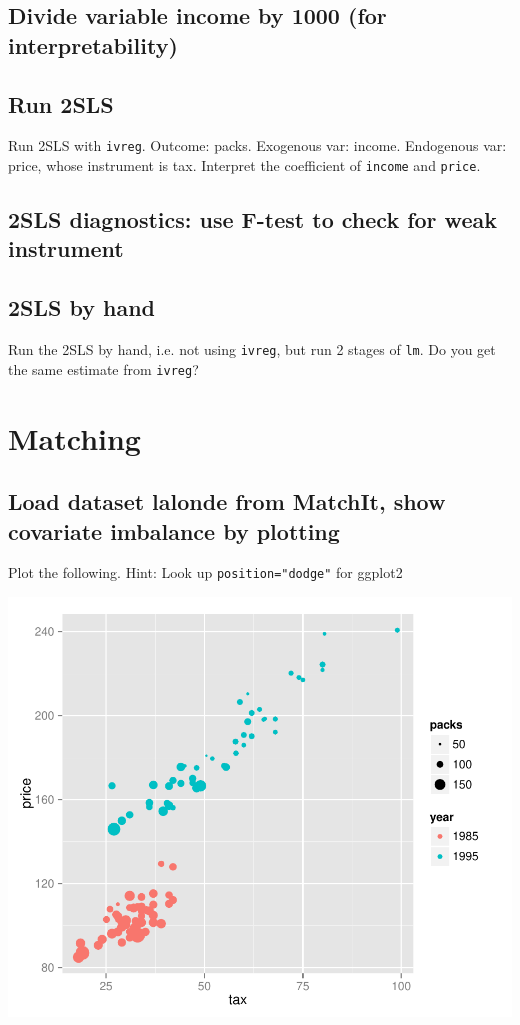 \documentclass{article}\usepackage[]{graphicx}\usepackage[]{color}
\makeatletter
\def\maxwidth{ %
  \ifdim\Gin@nat@width>\linewidth
    \linewidth
  \else
    \Gin@nat@width
  \fi
}
\newenvironment{knitrout}{}{} %
\makeatother
\begin{document}
\subsection{Divide variable income by 1000 (for interpretability)}

\subsection{Run 2SLS}

Run 2SLS with \verb`ivreg`. Outcome: packs. Exogenous var: income. Endogenous var: price, whose instrument is tax. Interpret the coefficient of \verb`income` and \verb`price`.

\subsection{2SLS diagnostics: use F-test to check for weak instrument}

\subsection{2SLS by hand}

Run the 2SLS by hand, i.e. not using \verb`ivreg`, but run 2 stages of \verb`lm`. Do you get the same estimate from \verb`ivreg`?

\section{Matching}

\subsection{Load dataset lalonde from MatchIt, show covariate imbalance by plotting}

Plot the following. Hint: Look up \verb|position="dodge"| for ggplot2

\begin{knitrout}
\color{fgcolor}
\includegraphics[width=\maxwidth]{figure/unnamed-chunk-2-1} 

\end{knitrout}
\end{document}
